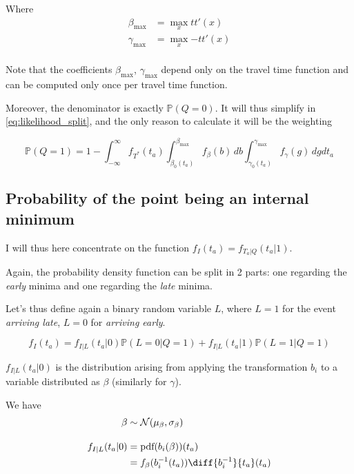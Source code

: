\documentclass{article}
\begin{document}
Where
\begin{align*}
  \beta_\text{max} & = \max_x{tt'(x)} \\
  \gamma_\text{max} & = \max_x{-tt'(x)} \\
\end{align*}

Note that the coefficients \(\beta_\text{max}\), \(\gamma_\text{max}\) depend only on the travel time function and can be computed only once per travel time function.

Moreover, the denominator is exactly \(\mathbb{P}(Q = 0)\).
It will thus simplify in \eqref{eq:likelihood_split}, and the only reason to calculate it will be the weighting

\begin{equation}
  \label{eq:prob_int}
  \mathbb{P}(Q = 1) = 1 - \int_{-\infty}^\infty f_{T^*}(t_a)\int_{\beta_0(t_a)}^{\beta_\text{max}}f_\beta(b)\, db\int_{\gamma_0(t_a)}^{\gamma_\text{max}}f_\gamma(g)\, dgdt_a
\end{equation}

\subsection{Probability of the point being an internal minimum}

I will thus here concentrate on the function \(f_I(t_a) = f_{T_a | Q}(t_a | 1)\).

Again, the probability density function can be split in 2 parts:
one regarding the \textit{early} minima and one regarding the \textit{late} minima.

Let's thus define again a binary random variable \(L\), where \(L=1\) for the event \textit{arriving late}, \(L=0\) for \textit{arriving early}.

\begin{equation}
  \label{eq:internal_split}
  f_I(t_a) = f_{I | L}(t_a | 0) \mathbb{P}(L=0 | Q=1) + f_{I | L}(t_a | 1) \mathbb{P}(L=1 | Q=1)
\end{equation}

\(f_{I | L}(t_a | 0)\) is the distribution arising from applying the transformation \(b_i\) to a variable distributed as \(\beta\) (similarly for \(\gamma\)).

We have
\begin{align}
  \label{eq:pdf_bi}
  \begin{split}
    \beta & \sim \mathcal{N}(\mu_\beta, \sigma_\beta) \\[1em]
    f_{I | L}(t_a | 0) & = \text{pdf}(b_i(\beta))(t_a) \\
    & = f_\beta(b_i^{-1}(t_a))\diff{b_i^{-1}}{t_a}(t_a)
  \end{split}
\end{align}
\end{document}
